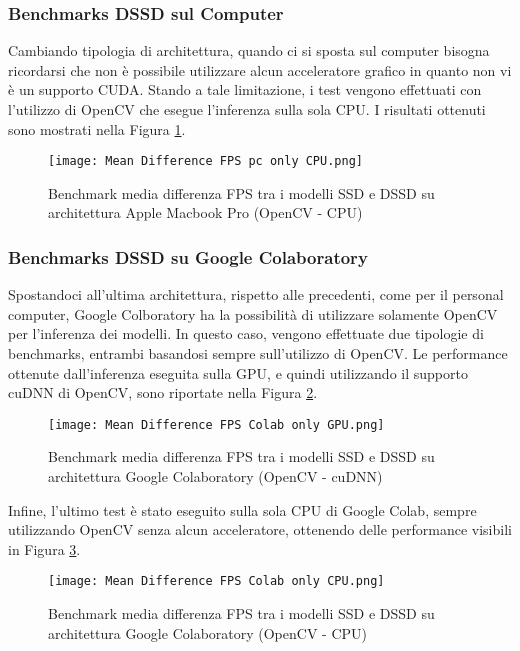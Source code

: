 \subsubsection{Benchmarks DSSD sul Computer}
Cambiando tipologia di architettura, quando ci si sposta sul computer 
bisogna ricordarsi che non è possibile utilizzare alcun acceleratore grafico 
in quanto non vi è un supporto CUDA. Stando a tale limitazione, i test 
vengono effettuati con l'utilizzo di OpenCV che esegue l'inferenza sulla sola 
CPU. I risultati ottenuti sono mostrati nella Figura \ref{bench-pc-cv2-CPU}.
\begin{figure}
    \centering
    \texttt{[image: Mean Difference FPS pc only CPU.png]}
    \centering
    \caption{Benchmark media differenza FPS tra i modelli SSD e DSSD su architettura Apple Macbook Pro (OpenCV - CPU)}
    \label{bench-pc-cv2-CPU}
\end{figure}

\subsubsection{Benchmarks DSSD su Google Colaboratory}
Spostandoci all'ultima architettura, rispetto alle precedenti, come per il personal 
computer, Google Colboratory ha la possibilità di utilizzare solamente 
OpenCV per l'inferenza dei modelli. In questo caso, vengono effettuate 
due tipologie di benchmarks, entrambi basandosi sempre sull'utilizzo di 
OpenCV. Le performance ottenute dall'inferenza eseguita sulla GPU, e 
quindi utilizzando il supporto cuDNN di OpenCV, sono riportate nella 
Figura \ref{bench-colab-cv2-cudnn}.
\begin{figure}
    \centering
    \texttt{[image: Mean Difference FPS Colab only GPU.png]}
    \centering
    \caption{Benchmark media differenza FPS tra i modelli SSD e DSSD su architettura Google Colaboratory (OpenCV - cuDNN)}
    \label{bench-colab-cv2-cudnn}
\end{figure}
Infine, l'ultimo test è stato eseguito sulla sola CPU di Google 
Colab, sempre utilizzando OpenCV senza alcun acceleratore, ottenendo 
delle performance visibili in Figura \ref{bench-colab-cv2-cpu}.
\begin{figure}
    \centering
    \texttt{[image: Mean Difference FPS Colab only CPU.png]}
    \centering
    \caption{Benchmark media differenza FPS tra i modelli SSD e DSSD su architettura Google Colaboratory (OpenCV - CPU)}
    \label{bench-colab-cv2-cpu}
\end{figure}

